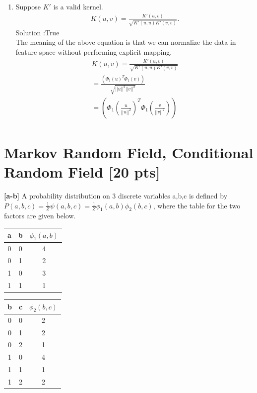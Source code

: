 \documentclass[twoside,11pt]{article}\usepackage{amsmath,amsfonts,amsthm,fullpage}
\begin{document}
\begin{enumerate}
\item Suppose $K'$ is a valid kernel. 
	\begin{align}
	K(u,v) = \frac{K'(u,v)}{\sqrt{K'(u,u)K'(v,v)}}.
	\end{align}
Solution :True \\
The meaning of the above equation is that we can normalize the data in feature space without performing  explicit mapping. \\
\begin{equation}
\begin{split}
	K(u,v) = \frac{K'(u,v)}{\sqrt{K'(u,u)K'(v,v)}}\\
	= \frac{({\Phi_1(u)}^T{\Phi_1(v)})}{\sqrt{||u||^2 ||v||^2}}\\
	= ({\Phi_1(\frac{u}{||u||^2})}^T{\Phi_1(\frac{v}{||v||^2})})\\
\end{split}
\end{equation}
\end{enumerate} 
 
 

\section{Markov Random Field, Conditional Random Field [20 pts]}

\textbf{[a-b]} A probability distribution on  3 discrete variables
a,b,c is defined by $P(a,b,c) = \frac{1}{Z}\psi(a,b,c) =
\frac{1}{Z}\phi_1(a,b)\phi_2(b,c)$, where the table for the two
factors are given below.

\begin{table}[!htb]

    \begin{minipage}{.5\linewidth}

      \centering

    \begin{tabular}{cc|c}
    a & b & $\phi_1(a,b)$ \\ \hline
    0 & 0 & 4             \\
    0 & 1 & 2             \\
    1 & 0 & 3             \\
    1 & 1 & 1             \\
    \end{tabular}

    \end{minipage}%
    \begin{minipage}{.5\linewidth}
      \centering
     \begin{tabular}{cc|c}
    b & c & $\phi_2(b,c)$ \\ \hline
    0 & 0 & 2             \\
    0 & 1 & 2             \\
    0 & 2 & 1             \\
    1 & 0 & 4             \\
    1 & 1 & 1             \\
    1 & 2 & 2             \\
    \end{tabular}
    \end{minipage}
\end{table}
\end{document}
